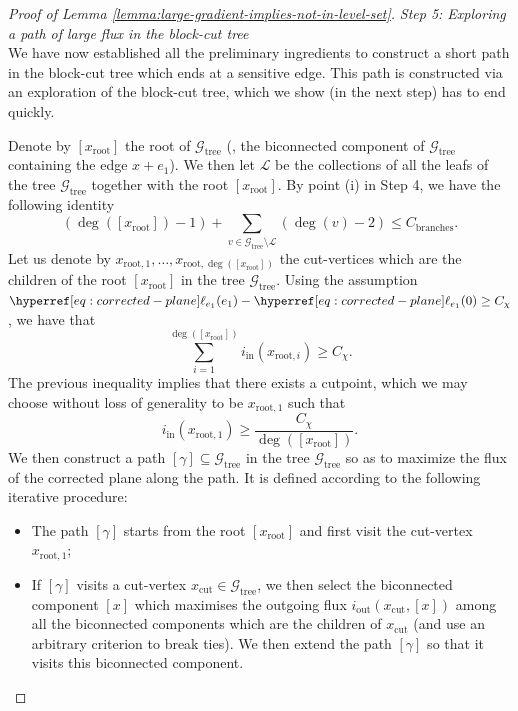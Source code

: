 \documentclass[12pt]{amsart}
\numberwithin{equation}{section}
\begin{document}
\begin{proof}[Proof of Lemma \ref{lemma:large-gradient-implies-not-in-level-set}]
		
		{\it Step 5: Exploring a path of large flux in the block-cut tree} \\
		We have now established all the preliminary ingredients to construct a short path in the block-cut tree which ends at a sensitive edge. This path is constructed
		via an exploration of the block-cut tree, which we show (in the next step) has to end quickly. 
		
		Denote by $[x_{\mathrm{root}}]$ the root of $\mathcal{G}_{\mathrm{tree}}$ (\ie, the biconnected component of $\mathcal{G}_{\mathrm{tree}}$ containing the edge $x +  e_1$). We then let $\mathcal{L}$ be the collections of all the leafs of the tree $\mathcal{G}_{\mathrm{tree}}$ together with the root $[x_{\mathrm{root}}]$. By point (i) in Step 4, we have the following identity
		\begin{equation} \label{eq:bound.generaltree}
			(\deg ([x_{\mathrm{root}}]) - 1) + \sum_{v \in \mathcal{G}_{\mathrm{tree}} \setminus \mathcal{L}} (\deg (v) - 2) \leq C_{\mathrm{branches}}.
		\end{equation}
		Let us denote by $x_{\mathrm{root}, 1}, \ldots, x_{\mathrm{root}, \deg ([x_{\mathrm{root}}])}$ the cut-vertices which are the children of the root $[x_{\mathrm{root}}]$ in the tree $\mathcal{G}_{\mathrm{tree}}$. Using the assumption $\ellp{e_1} (e_1) - \ellp{e_1} (0) \geq C_\chi$, we have that
		\begin{equation*}
			\sum_{i = 1}^{\deg ([x_{\mathrm{root}}])} i_{\mathrm{in}}(x_{\mathrm{root},i}) \geq C_{\chi}.
		\end{equation*}
		The previous inequality implies that there exists a cutpoint, which we may choose without loss of generality to be $x_{\mathrm{root},1}$ such that
		\begin{equation*}
			i_{\mathrm{in}}(x_{\mathrm{root},1}) \geq \frac{C_{\chi}}{\deg ([x_{\mathrm{root}}])}.
		\end{equation*}
		We then construct a path $[\gamma] \subseteq \mathcal{G}_{\mathrm{tree}}$ in the tree $\mathcal{G}_{\mathrm{tree}}$ so as to maximize the flux of the corrected plane along the path. It is defined according to the following iterative procedure:
		\begin{itemize}
			\item The path $[\gamma]$ starts from the root $[x_{\mathrm{root}}]$ and first visit the cut-vertex $x_{\mathrm{root},1}$;
			\item If $[\gamma]$ visits a cut-vertex $x_{\mathrm{cut}} \in \mathcal{G}_{\mathrm{tree}}$, we then select the biconnected component $[x]$ which maximises the outgoing flux $i_{\mathrm{out}}(x_{\mathrm{cut}} , [x])$ among all the biconnected components which are the children of $x_{\mathrm{cut}}$ (and use an arbitrary criterion to break ties). We then extend the path $[\gamma]$ so that it visits this biconnected component.

\end{itemize}
\end{proof}
\end{document}
